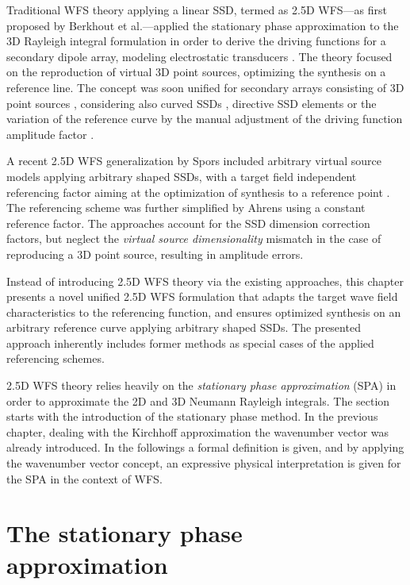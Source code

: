 Traditional WFS theory applying a linear SSD, termed as 2.5D WFS---as first proposed by Berkhout et al.---applied the stationary phase approximation to the 3D Rayleigh integral formulation in order to derive the driving functions for a secondary dipole array, modeling electrostatic transducers \cite{Berkhout1988, Berkhout93}.
The theory focused on the reproduction of virtual 3D point sources, optimizing the synthesis on a reference line.
The concept was soon unified for secondary arrays consisting of 3D point sources \cite{Start1997:phd,Vogel1993:phd, Verheijen1997:phd, Bruijn2004, Hulsebos2004}, considering also curved SSDs \cite{start1996application}, directive SSD elements \cite{devries1996sound} or the variation of the reference curve by the manual adjustment of the driving function amplitude factor \cite{Sonke1998, Sonke2000:Phd}.

A recent 2.5D WFS generalization by Spors included arbitrary virtual source models applying arbitrary shaped SSDs, with a target field independent referencing factor aiming at the optimization of synthesis to a reference point \cite{Spors2008:WFSrevisited}.
The referencing scheme was further simplified by Ahrens \cite{Ahrens2012} using a constant reference factor.
The approaches account for the SSD dimension correction factors, but neglect the \emph{virtual source dimensionality} mismatch \cite{Voelk2012} in the case of reproducing a 3D point source, resulting in amplitude errors.

Instead of introducing 2.5D WFS theory via the existing approaches, this chapter presents a novel unified 2.5D WFS formulation that adapts the target wave field characteristics to the referencing function, and ensures optimized synthesis on an arbitrary reference curve applying arbitrary shaped SSDs.
The presented approach inherently includes former methods as special cases of the applied referencing schemes.

2.5D WFS theory relies heavily on the \emph{stationary phase approximation} (SPA) in order to approximate the 2D and 3D Neumann Rayleigh integrals.
The section starts with the introduction of the stationary phase method.
In the previous chapter, dealing with the Kirchhoff approximation the wavenumber vector was already introduced.
In the followings a formal definition is given, and by applying the wavenumber vector concept, an expressive physical interpretation is given for the SPA in the context of WFS.

%
\section{The stationary phase approximation}
\label{Section:25D_WFS:SPA}
%
